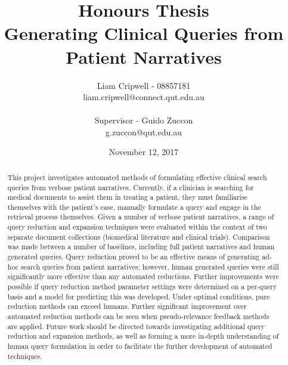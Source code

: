 \documentclass[a4paper]{report}
\begin{document}
\title{\small Honours Thesis\\\huge Generating Clinical Queries from Patient Narratives}

\author{Liam Cripwell - 08857181\\liam.cripwell@connect.qut.edu.au\\\\\small Supervisor - Guido Zuccon\\\small g.zuccon@qut.edu.au\\}
\date{November 12, 2017}
\maketitle
\pagebreak

\begin{abstract}
This project investigates automated methods of formulating effective clinical search queries from verbose patient narratives. Currently, if a clinician is searching for medical documents to assist them in treating a patient, they must familiarise themselves with the patient's case, manually formulate a query and engage in the retrieval process themselves. Given a number of verbose patient narratives, a range of query reduction and expansion techniques were evaluated within the context of two separate document collections (biomedical literature and clinical trials). Comparison was made between a number of baselines, including full patient narratives and human generated queries. Query reduction proved to be an effective means of generating ad-hoc search queries from patient narratives; however, human generated queries were still significantly more effective than any automated reductions. Further improvements were possible if query reduction method parameter settings were determined on a per-query basis and a model for predicting this was developed. Under optimal conditions, pure reduction methods can exceed humans. Further significant improvement over automated reduction methods can be seen when pseudo-relevance feedback methods are applied. Future work should be directed towards investigating additional query reduction and expansion methods, as well as forming a more in-depth understanding of human query formulation in order to facilitate the further development of automated techniques.
\end{abstract}

\pagebreak
\tableofcontents
\pagebreak
\end{document}
